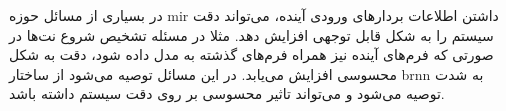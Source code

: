در بسیاری از مسائل حوزه \gls{mir} داشتن اطلاعات بردارهای ورودی آینده، می‌تواند
دقت سیستم را به شکل قابل توجهی افزایش دهد. مثلا در مسئله تشخیص شروع نت‌ها در
صورتی که فرم‌های آینده نیز همراه فرم‌های گذشته به مدل داده شود، دقت به شکل
محسوسی افزایش می‌یابد. در این مسائل توصیه می‌شود از ساختار \gls{brnn} به شدت
توصیه می‌شود و می‌تواند تاثیر محسوسی بر روی دقت سیستم داشته باشد.